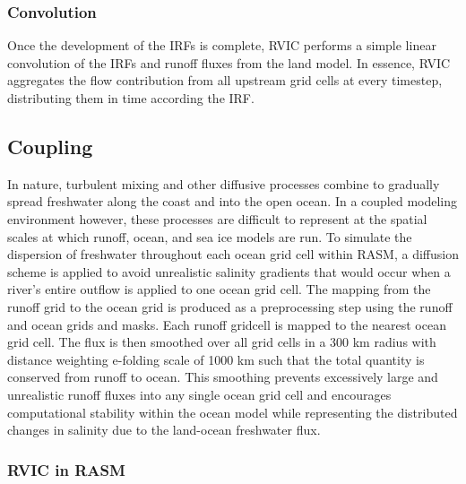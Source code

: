 \documentclass[jgrga, draft]{agutex}
\begin{document}
\begin{article}
\subsubsection{Convolution}
\label{sec:convolution}

Once the development of the IRFs is complete, RVIC performs a simple linear convolution of the IRFs and runoff fluxes from the land model.
In essence, RVIC aggregates the flow contribution from all upstream grid cells at every timestep, distributing them in time according the IRF.

\subsection{Coupling}
\label{sec:coupling}

In nature, turbulent mixing and other diffusive processes combine to gradually spread freshwater along the coast and into the open ocean.
In a coupled modeling environment however, these processes are difficult to represent at the spatial scales at which runoff, ocean, and sea ice models are run.
To simulate the dispersion of freshwater throughout each ocean grid cell within RASM, a diffusion scheme is applied to avoid unrealistic salinity gradients that would occur when a river’s entire outflow is applied to one ocean grid cell.
The mapping from the runoff grid to the ocean grid is produced  as a preprocessing step using the runoff and ocean grids and masks.
Each runoff gridcell is mapped to the nearest ocean grid cell.
The flux is then smoothed over all grid cells in a 300 km radius with distance weighting e-folding scale of 1000 km  such that the total quantity is conserved from runoff to ocean.
This smoothing prevents excessively large and unrealistic runoff fluxes into any single ocean grid cell and encourages computational stability within the ocean model while representing the distributed changes in salinity due to the land-ocean freshwater flux.

\subsubsection{RVIC in RASM}


\end{article}
\end{document}
